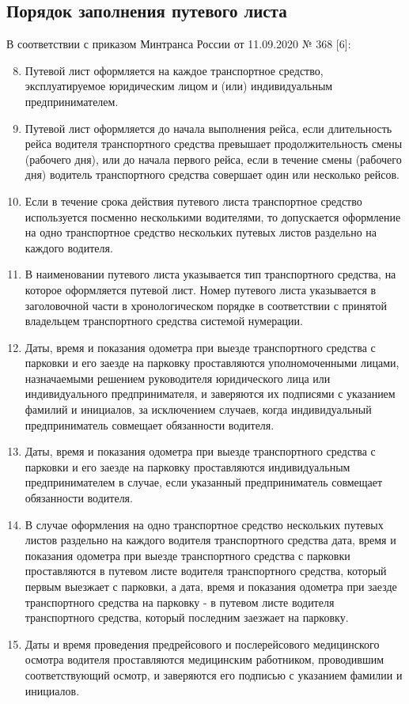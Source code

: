 \documentclass[../nirs.tex]{subfiles}
\begin{document}
\subsection{Порядок заполнения путевого листа}
В соответствии с приказом Минтранса России от 11.09.2020 № 368  [6]:
\begin{enumerate}
	\setcounter{enumi}{7}
	\item Путевой лист оформляется на каждое транспортное средство,
		эксплуатируемое юридическим лицом и (или) индивидуальным
		предпринимателем.
	\item Путевой лист оформляется до начала выполнения рейса, если длительность
		рейса водителя транспортного средства превышает продолжительность смены
		(рабочего дня), или до начала первого рейса, если в течение смены
		(рабочего дня) водитель транспортного средства совершает один или
		несколько рейсов.
	\item Если в течение срока действия путевого листа транспортное средство
		используется посменно несколькими водителями, то допускается оформление
		на одно транспортное средство нескольких путевых листов раздельно на
		каждого водителя.
	\item В наименовании путевого листа указывается тип транспортного средства,
		на которое оформляется путевой лист. Номер путевого листа указывается в
		заголовочной части в хронологическом порядке в соответствии с принятой
		владельцем транспортного средства системой нумерации.
	\item Даты, время и показания одометра при выезде транспортного средства с
		парковки и его заезде на парковку проставляются уполномоченными лицами,
		назначаемыми решением руководителя юридического лица или индивидуального
		предпринимателя, и заверяются их подписями с указанием фамилий и
		инициалов, за исключением случаев, когда индивидуальный предприниматель
		совмещает обязанности водителя.
	\item Даты, время и показания одометра при выезде транспортного средства с
		парковки и его заезде на парковку проставляются индивидуальным
		предпринимателем в случае, если указанный предприниматель совмещает
		обязанности водителя.
	\item В случае оформления на одно транспортное средство нескольких путевых
		листов раздельно на каждого водителя транспортного средства дата, время
		и показания одометра при выезде транспортного средства с парковки
		проставляются в путевом листе водителя транспортного средства, который
		первым выезжает с парковки, а дата, время и показания одометра при
		заезде транспортного средства на парковку - в путевом листе водителя
		транспортного средства, который последним заезжает на парковку.
	\item Даты и время проведения предрейсового и послерейсового медицинского
		осмотра водителя проставляются медицинским работником, проводившим
		соответствующий осмотр, и заверяются его подписью с указанием фамилии и
		инициалов.


\end{enumerate}
\end{document}
